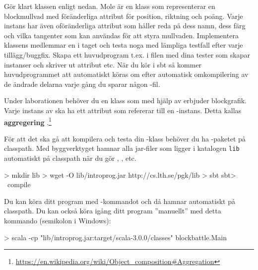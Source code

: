 \Subtask Gör klart klassen  enligt nedan. Mole är en klass som representerar en blockmullvad med föränderliga attribut för position, riktning och poäng. Varje instans har även oföränderliga attribut som håller reda på dess namn, dess färg och vilka tangenter som kan användas för att styra mullvaden. Implementera klassens medlemmar en i taget och testa noga med lämpliga testfall efter varje tillägg/buggfix. Skapa ett huvudprogram t.ex. i filen  med dina tester som skapar instanser och skriver ut attribut etc. När du kör  i sbt så kommer huvudprogrammet att automatiskt köras om efter automatisk omkompilering av de ändrade delarna varje gång du sparar någon -fil.
%
%
%
%
%



\Subtask Under laborationen behöver du en klass  som med hjälp av  erbjuder blockgrafik. Varje instans av  ska ha ett attribut som refererar till en -instans. Detta kallas \textbf{aggregering} .\footnote{\url{https://en.wikipedia.org/wiki/Object\_composition\#Aggregation}}

För att det ska gå att kompilera och testa din -klass behöver du ha -paketet på classpath. Med byggverktyget  hamnar alla jar-filer som ligger i katalogen \texttt{lib} automatiskt på classpath när du gör , , etc.

\begin{REPLnonum}
> mkdir lib
> wget -O lib/introprog.jar http://cs.lth.se/pgk/lib
> sbt
sbt> ~compile
\end{REPLnonum}
Du kan köra ditt program med -kommandot  och då hamnar  automatiskt på classpath. Du kan också köra igång ditt program ''manuellt'' med detta kommando (semikolon i Windows):
\begin{REPLnonum}
> scala -cp "lib/introprog.jar:target/scala-3.0.0/classes" blockbattle.Main
\end{REPLnonum}

